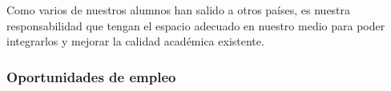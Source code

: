 Como varios de nuestros alumnos han salido a otros países, es nuestra responsabilidad que tengan el 
espacio adecuado en nuestro medio para poder integrarlos y mejorar la calidad académica existente.

\subsubsection{Oportunidades de empleo}


